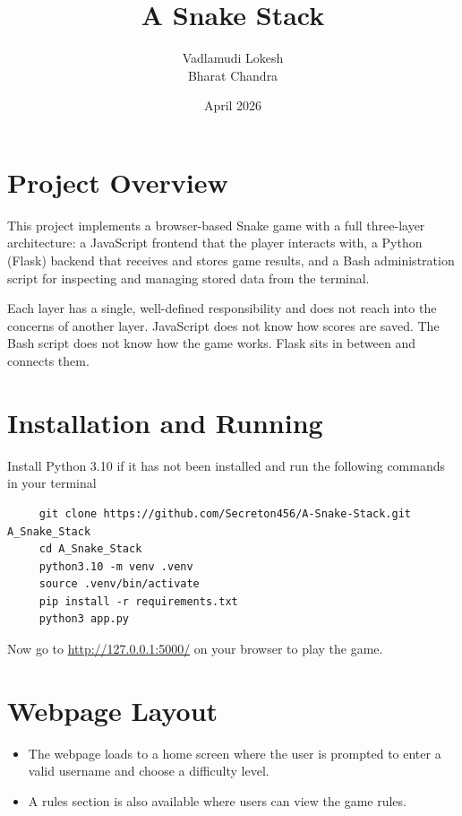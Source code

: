 \documentclass{article}
\title{A Snake Stack}
\author{Vadlamudi Lokesh \\ Bharat Chandra}
\date{April 2026}
\begin{document}
    \maketitle{}
    \tableofcontents
    \clearpage
    
    \section{Project Overview}

    This project implements a browser-based Snake game with a full three-layer architecture:
    a JavaScript frontend that the player interacts with, a Python (Flask) backend that receives
    and stores game results, and a Bash administration script for inspecting and managing stored
    data from the terminal.

    Each layer has a single, well-defined responsibility and does not reach into the concerns of 
    another layer. JavaScript does not know how scores are saved. The Bash script does not know 
    how the game works. Flask sits in between and connects them.

    \section{Installation and Running}

     Install Python 3.10 if it has not been installed and run the following commands in your terminal
     \begin{verbatim}
     git clone https://github.com/Secreton456/A-Snake-Stack.git A_Snake_Stack
     cd A_Snake_Stack
     python3.10 -m venv .venv
     source .venv/bin/activate
     pip install -r requirements.txt
     python3 app.py
    \end{verbatim}

    Now go to \href{http://127.0.0.1:5000/}{http://127.0.0.1:5000/} on your browser to play the game.
    
    
    \section{Webpage Layout}
    \begin{itemize}
        \item 
    The webpage loads to a home screen where the user is prompted to enter a valid username and choose a difficulty level.
    \item A rules section is also available where users can view the game rules.
    \end{itemize}
    
\end{document}

